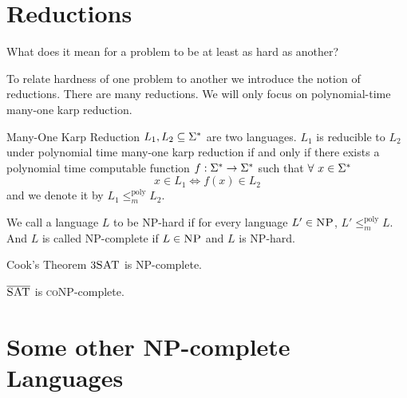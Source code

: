 \section{Reductions}
\begin{question}{}{}
    What does it mean for a problem to be at least as hard as another? 
\end{question}
To relate hardness of one problem to another we introduce the notion of reductions. There are many reductions. We will only focus on polynomial-time many-one karp reduction. 
\begin{Definition}{Many-One Karp Reduction}{}
$L_1,L_2\subseteq\Sigma^*$ are two languages. $L_1$ is reducible to $L_2$ under polynomial time many-one karp reduction if and only if there exists a polynomial time computable  function $f:\Sigma^*\to\Sigma^*$ such that $\forall\ x\in \Sigma^*$ $$x\in L_1\iff f(x)\in L_2$$ and we denote it by $L_1\leq_{m}^{\text{poly}} L_2$. 
\end{Definition}
We call a language $L$ to be \textsc{NP}-hard if for every language $L'\in\textsc{NP}$, $L'\leq_{m}^{\text{poly}}L$. And $L$ is called \textsc{NP}-complete if $L\in\textsc{NP}$ and $L$ is \textsc{NP}-hard. 
\begin{Theorem}{Cook's Theorem}{}
$3\textsc{SAT}$ is \textsc{NP}-complete.
\end{Theorem}
\begin{corolary}{}{}
    $\overline{\textsc{SAT}}$ is \textsc{coNP}-complete. 
\end{corolary}
\section{Some other \textsc{NP}-complete Languages}